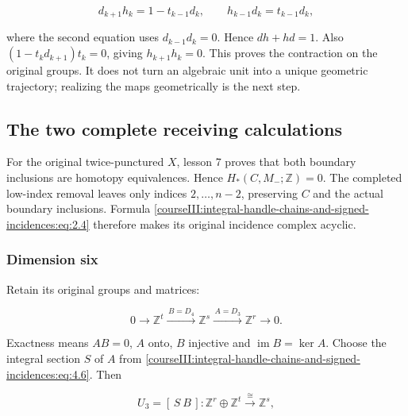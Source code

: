 \begin{equation}
d_{k+1}h_k=1-t_{k-1}d_k,\qquad
 h_{k-1}d_k=t_{k-1}d_k,
 \label{courseIII:integral-handle-chains-and-signed-incidences:eq:5.10}
\end{equation}

where the second equation uses \(d_{k-1}d_k=0\). Hence \(dh+hd=1\). Also \((1-t_kd_{k+1})t_k=0\), giving \(h_{k+1}h_k=0\). This proves the contraction on the original groups. It does not turn an algebraic unit into a unique geometric trajectory; realizing the maps geometrically is the next step.

\subsection{The two complete receiving calculations}
\label{courseIII:integral-handle-chains-and-signed-incidences:handle-six-seven}

\label{courseIII:integral-handle-chains-and-signed-incidences:section-6}

For the original twice-punctured \(X\), lesson 7 proves that both boundary inclusions are homotopy equivalences. Hence \(H_*(C,M_-;\mathbb Z)=0\). The completed low-index removal leaves only indices \(2,\ldots,n-2\), preserving \(C\) and the actual boundary inclusions. Formula \eqref{courseIII:integral-handle-chains-and-signed-incidences:eq:2.4} therefore makes its original incidence complex acyclic.

\subsubsection{Dimension six}
\label{courseIII:integral-handle-chains-and-signed-incidences:section-6.1}

\label{courseIII:handle-chains:6.1}

Retain its original groups and matrices:

\begin{equation}
0\longrightarrow\mathbb Z^t
 \xrightarrow{\,B=D_4\,}\mathbb Z^s
 \xrightarrow{\,A=D_3\,}\mathbb Z^r
 \longrightarrow0.
 \label{courseIII:integral-handle-chains-and-signed-incidences:eq:6.1}
\end{equation}

Exactness means \(AB=0\), \(A\) onto, \(B\) injective and \(\operatorname{im}B=\ker A\). Choose the integral section \(S\) of \(A\) from \eqref{courseIII:integral-handle-chains-and-signed-incidences:eq:4.6}. Then

\begin{equation}
U_3=[\,S\ B\,]:\mathbb Z^r\oplus\mathbb Z^t
 \xrightarrow{\ \cong\ }\mathbb Z^s,
 \label{courseIII:integral-handle-chains-and-signed-incidences:eq:6.2}
\end{equation}

